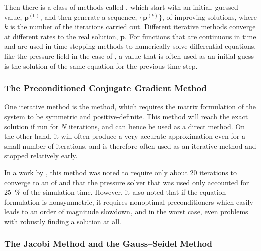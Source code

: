 Then there is a class of methods called , which start with an initial, guessed value, $\mathbf{p}^{(0)}$, and then generate a sequence, $\{\mathbf{p}^{(k)}\}$, of improving \approximate solutions, where $k$ is the number of the iterations carried out. Different iterative methods converge at different rates to the real solution, $\mathbf{p}$. For functions that are continuous in time and are used in time-stepping methods to numerically solve differential equations, like the pressure field in the case of \CFD, a value that is often used as an initial guess is the solution of the same equation for the previous time step.

\subsubsection{The Preconditioned Conjugate Gradient Method}


One iterative method is the \PCG method, which requires the matrix formulation of the system to be symmetric and positive-definite. This method will reach the exact solution if run for $N$ iterations, and can hence be used as a direct method. On the other hand, it will often produce a very accurate approximation even for a small number of iterations, and is therefore often used as an iterative method and stopped relatively early.

In a work by \citet{Losasso2004}, this method was noted to require only about 20 iterations to converge to an \accuracy of  and that the pressure solver that was used only accounted for \mbox{25 \%} of the simulation time. However, it also noted that if the equation formulation is nonsymmetric, it requires nonoptimal preconditioners which easily leads to an order of magnitude slowdown, and in the worst case, even problems with robustly finding a solution at all.

\subsubsection{The Jacobi Method and the Gauss--Seidel Method}

